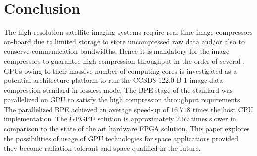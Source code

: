 \section{Conclusion}\label{sec:conc}
The high-resolution satellite imaging systems require real-time image compressors on-board due to limited storage to store uncompressed raw data and/or also to conserve communication bandwidths. Hence it is mandatory for the image compressors to guarantee high compression throughput in the order of several . \glspl{GPU} owing to their massive number of computing cores is investigated as a potential architecture platform to run the CCSDS 122.0-B-1 image data compression standard in lossless mode. The \gls{BPE} stage of the standard was parallelized on \gls{GPU} to satisfy the high compression throughput requirements. The parallelized \gls{BPE} achieved an average speed-up of $16.718$ times the host CPU implementation. The \gls{GPGPU} solution is approximately $2.59$ times slower in comparison to the state of the art hardware FPGA solution. This paper explores the possibilities of usage of \gls{GPU} technologies for space applications provided they become radiation-tolerant and space-qualified in the future.
